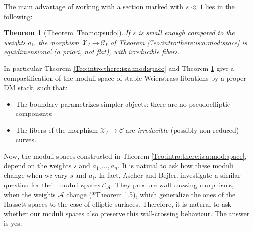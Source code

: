 \documentclass[11pt]{amsart}
\newcommand{\sC}{\mathscr{C}}
\newcommand{\sX}{\mathscr{X}}
\newtheorem{Teo}[theorem]{Theorem}
\theoremstyle{definition}
\begin{document}
The main advantage of working with a section marked with $s \ll 1$ lies in the following:
\begin{Teo}[Theorem \ref{Teo:no:psudo}]\label{Teo:intro:have:flat:fibration} If $s$ is small enough compared to the weights $a_i$, the morphism $\sX_I \to \sC_I$ of Theorem \ref{Teo:intro:there:is:a:mod:space} is equidimensional (a priori, \emph{not} flat), with irreducible fibers.
\end{Teo}
In particular Theorem \ref{Teo:intro:there:is:a:mod:space} and Theorem \ref{Teo:intro:have:flat:fibration} give a compactification of the moduli space of stable Weierstrass fibrations by a proper DM stack, such that:
\begin{itemize}
\item The boundary parametrizes simpler objects: there are no pseudoelliptic components;
\item The fibers of the morphism $\sX_I \to \sC$ are \emph{irreducible} (possibly non-reduced) curves.
\end{itemize}

Now, the moduli spaces constructed in Theorem \ref{Teo:intro:there:is:a:mod:space}, depend on the weights $s$ and $a_1,...,a_n$. It is natural to ask how these moduli change when we vary $s$ and $a_i$. In fact, Ascher and Bejleri investigate a similar question for their moduli spaces $\mathcal{E}_\mathcal{A}$.
They produce wall crossing morphisms, when the weights $\mathcal{A}$ change (\cite{AB3}*{Theorem 1.5}), which generalize the ones of the Hassett spaces \cite{Hassett} to the case of elliptic surfaces. Therefore, it is natural to ask whether our moduli spaces also preserve this wall-crossing behaviour. The answer is yes.
\end{document}
